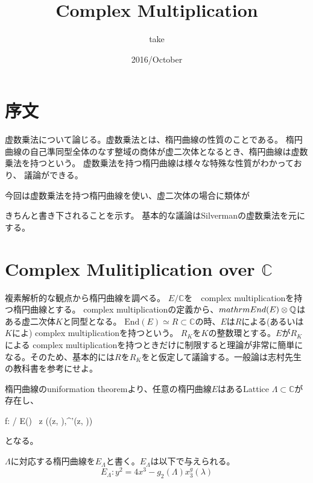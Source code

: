 \documentclass{ujarticle}
\title{Complex Multiplication}
\author{take}
\date{2016/October}
\begin{document}
\section{序文}
\label{sec:序文}
虚数乗法について論じる。虚数乗法とは、楕円曲線の性質のことである。
楕円曲線の自己準同型全体のなす整域の商体が虚二次体となるとき、楕円曲線は虚数乗法を持つという。
虚数乗法を持つ楕円曲線は様々な特殊な性質がわかっており、
議論ができる。

今回は虚数乗法を持つ楕円曲線を使い、虚二次体の場合に類体が

きちんと書き下されることを示す。
基本的な議論はSilvermanの虚数乗法を元にする。


\section{Complex Mulitiplication over $\mathbb{C}$}
\label{sec:Complex Mulitiplication over  $\mathbbC$ }

複素解析的な観点から楕円曲線を調べる。
$E/\mathbb{C}$を　complex multiplicationを持つ楕円曲線とする。 complex multiplicationの定義から、$\\mathrm{End}(E) \otimes \mathbb{Q}$はある虚二次体$K$と同型となる。
$\mathrm{End}(E) \simeq R \subset \mathbb{C} $の時、$E$は$R$による(あるいは$K$によ) complex multiplicationを持つという。
$R_K$を$K$の整数環とする。$E$が$R_K$による complex multiplicationを持つときだけに制限すると理論が非常に簡単になる。そのため、基本的には$R$を$R_K$をと仮定して議論する。一般論は志村先生の教科書を参考にせよ。

楕円曲線のuniformation theoremより、任意の楕円曲線$E$はあるLattice $\Lambda \subset \mathbb{C} $が存在し、
\begin{eqnarry*}
  f: / \lambda \simeq E()   \
  z \mapsto ((z, \Lambda),^{'}(z, \Lambda))
\end{eqnarry*}
となる。

$\Lambda$に対応する楕円曲線を$E_{\Lambda}$と書く。$E_{\Lambda}$は以下で与えられる。
\begin{equation*}
E_{\Lambda}: y ^2 = 4x^3 - g_2(\Lambda)x ^g_3(\lambda)
\end{equation*}
\end{document}
